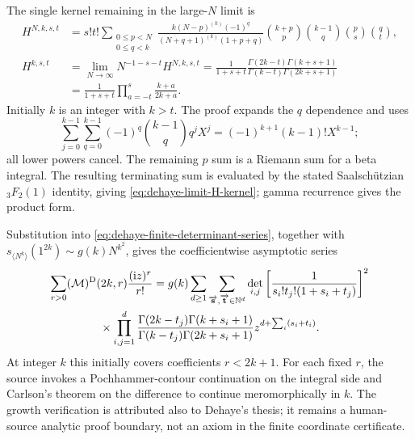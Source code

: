 The single kernel remaining in the large-$N$ limit is
\begin{align}
 H^{N,k,s,t}
 &=s!t!\sum_{\substack{0\leq p<N\\0\leq q<k}}
 \frac{k(N-p)^{(k)}(-1)^q}{(N+q+1)^{(k)}(1+p+q)}
 \binom{k+p}{p}\binom{k-1}{q}\binom ps\binom qt,
 \label{eq:dehaye-finite-H-kernel}\\
 H^{k,s,t}
 &=\lim_{N\to\infty}N^{-1-s-t}H^{N,k,s,t}
 =\frac1{1+s+t}
 \frac{\Gamma(2k-t)\Gamma(k+s+1)}
 {\Gamma(k-t)\Gamma(2k+s+1)}
 \label{eq:dehaye-limit-H-kernel}\\
 &=\frac1{1+s+t}\prod_{a=-t}^{s}\frac{k+a}{2k+a}.
 \label{eq:dehaye-H-rational-product}
\end{align}
Initially $k$ is an integer with $k>t$.  The proof expands the $q$ dependence and
uses
\[
 \sum_{j=0}^{k-1}\sum_{q=0}^{k-1}(-1)^q\binom{k-1}{q}q^jX^j
 =(-1)^{k+1}(k-1)!X^{k-1};
\]
all lower powers cancel.  The remaining $p$ sum is a Riemann sum for a beta integral.
The resulting terminating sum is evaluated by the stated Saalsch\"utzian
${}_3F_2(1)$ identity, giving \eqref{eq:dehaye-limit-H-kernel}; gamma recurrence
gives the product form.

Substitution into \eqref{eq:dehaye-finite-determinant-series}, together with
$s_{\langle N^k\rangle}(1^{2k})\sim g(k)N^{k^2}$, gives the coefficientwise
asymptotic series
\begin{multline}
 \sum_{r>0}(\mathcal M)^{\mathrm D}(2k,r)\frac{(\mathrm iz)^r}{r!}
 =g(k)\sum_{d\geq1}
 \sum_{{\overrightarrow{\mathbf{s}}},{\overrightarrow{\mathbf{t}}}\in\mathbb N^d}
 \det_{i,j}\left[\frac1{s_i!t_j!(1+s_i+t_j)}\right]^2\\
 {}\times\prod_{i,j=1}^{d}
 \frac{\Gamma(2k-t_j)\Gamma(k+s_i+1)}
 {\Gamma(k-t_j)\Gamma(2k+s_i+1)}
 z^{d+\sum_i(s_i+t_i)}.
 \label{eq:dehaye-asymptotic-determinant-series}
\end{multline}
At integer $k$ this initially covers coefficients $r<2k+1$.  For each fixed $r$,
the source invokes a Pochhammer-contour continuation on the integral side and
Carlson's theorem on the difference to continue meromorphically in $k$.  The
growth verification is attributed also to Dehaye's thesis; it remains a human-source
analytic proof boundary, not an axiom in the finite coordinate certificate.

